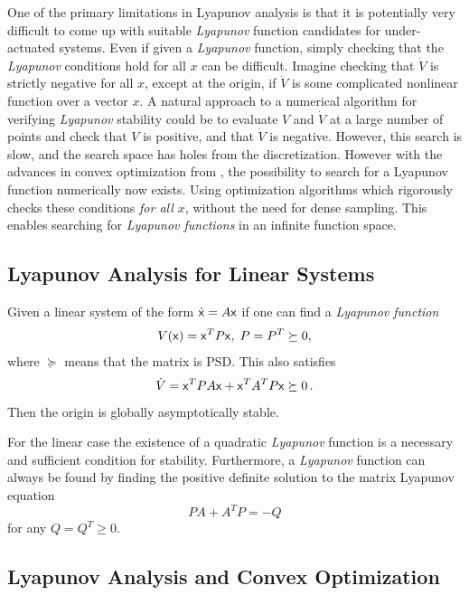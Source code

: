 One of the primary limitations in Lyapunov analysis is that it is potentially
very difficult to come up with suitable \textit{Lyapunov} function candidates
for under-actuated systems. Even if given a \textit{Lyapunov} function, simply
checking that the \textit{Lyapunov} conditions hold for all \(x\) can be
difficult. Imagine checking that \(\dot{V}\) is strictly negative for all \(x\),
except at the origin, if \(\dot{V}\) is some complicated nonlinear function over
a vector \(x\). A natural approach to a numerical algorithm for verifying
\textit{Lyapunov} stability could be to evaluate \(V\) and \(\dot{V}\) at a
large number of points and check that \(V\) is positive, and that \(\dot{V}\) is
negative. However, this search is slow, and the search space has holes from the
discretization. However with the advances in convex optimization from
\cite{parilloStructuredSemidefinitePrograms}, the possibility to search for a
Lyapunov function numerically now exists. Using optimization algorithms which
rigorously checks these conditions \textit{for all \(x\)}, without the need for
dense sampling. This enables searching for \textit{Lyapunov functions} in an
infinite function space.

\subsection{Lyapunov Analysis for Linear Systems}
\label{subsec:Lyapunov analysis for linear systems}

\begin{theorem}
  Given a linear system of the form \(\dot{{\mathbf{\mathsf{x}}}} = A{\mathbf{\mathsf{x}}}\) if one can
  find a \textit{Lyapunov function}
  \[
    V({\mathbf{\mathsf{x}}}) = {\mathbf{\mathsf{x}}}^{T}P{\mathbf{\mathsf{x}}}, \; P = P^{T} \succeq 0,
  \]
  where \(\succeq\) means that the matrix is \ac{PSD}. This also satisfies
  \[
    \dot{V} = {\mathbf{\mathsf{x}}}^{T}PA{\mathbf{\mathsf{x}}} + {\mathbf{\mathsf{x}}}^{T}A^{T}P{\mathbf{\mathsf{x}}} \succeq 0 \, .
  \]
  Then the origin is globally asymptotically stable.
\end{theorem}

For the linear case the existence of a quadratic \textit{Lyapunov} function is a
necessary and sufficient condition for stability. Furthermore, a
\textit{Lyapunov} function can always be found by finding the positive definite
solution to the matrix Lyapunov equation
\begin{equation}
  \label{eqn:linearlyapunov}
  PA + A^{T}P = -Q
\end{equation}
for any \(Q = Q^{T} \geqslant 0\).

\subsection{Lyapunov Analysis and Convex Optimization}

